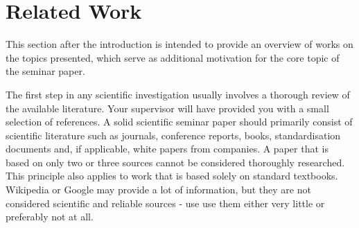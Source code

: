 \section{Related Work} 

This section after the introduction is intended to provide an overview of works on the topics
presented, which serve as additional motivation for the core topic of the seminar paper. 

The first step in any scientific investigation usually involves a thorough review of the available
literature. Your supervisor will have provided you with a small selection of references. A solid
scientific seminar paper should primarily consist of scientific literature such as journals,
conference reports, books, standardisation documents and, if applicable, white papers from
companies. A paper that is based on only two or three sources cannot be considered thoroughly
researched. This principle also applies to work that is based solely on standard textbooks.
Wikipedia or Google may provide a lot of information, but they are not considered scientific and
reliable sources - use use them either very little or preferably not at all.
